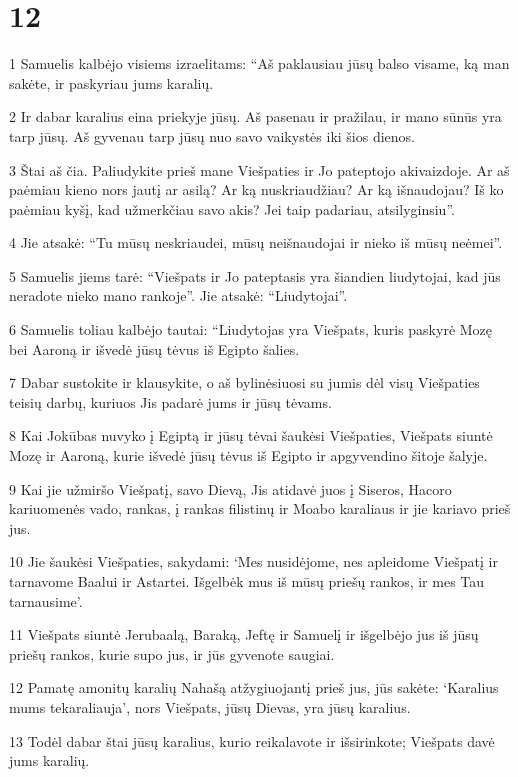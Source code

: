 \chapter{12}


\par 1 Samuelis kalbėjo visiems izraelitams: “Aš paklausiau jūsų balso visame, ką man sakėte, ir paskyriau jums karalių. 
\par 2 Ir dabar karalius eina priekyje jūsų. Aš pasenau ir pražilau, ir mano sūnūs yra tarp jūsų. Aš gyvenau tarp jūsų nuo savo vaikystės iki šios dienos. 
\par 3 Štai aš čia. Paliudykite prieš mane Viešpaties ir Jo pateptojo akivaizdoje. Ar aš paėmiau kieno nors jautį ar asilą? Ar ką nuskriaudžiau? Ar ką išnaudojau? Iš ko paėmiau kyšį, kad užmerkčiau savo akis? Jei taip padariau, atsilyginsiu”. 
\par 4 Jie atsakė: “Tu mūsų neskriaudei, mūsų neišnaudojai ir nieko iš mūsų neėmei”. 
\par 5 Samuelis jiems tarė: “Viešpats ir Jo pateptasis yra šiandien liudytojai, kad jūs neradote nieko mano rankoje”. Jie atsakė: “Liudytojai”. 
\par 6 Samuelis toliau kalbėjo tautai: “Liudytojas yra Viešpats, kuris paskyrė Mozę bei Aaroną ir išvedė jūsų tėvus iš Egipto šalies. 
\par 7 Dabar sustokite ir klausykite, o aš bylinėsiuosi su jumis dėl visų Viešpaties teisių darbų, kuriuos Jis padarė jums ir jūsų tėvams. 
\par 8 Kai Jokūbas nuvyko į Egiptą ir jūsų tėvai šaukėsi Viešpaties, Viešpats siuntė Mozę ir Aaroną, kurie išvedė jūsų tėvus iš Egipto ir apgyvendino šitoje šalyje. 
\par 9 Kai jie užmiršo Viešpatį, savo Dievą, Jis atidavė juos į Siseros, Hacoro kariuomenės vado, rankas, į rankas filistinų ir Moabo karaliaus ir jie kariavo prieš jus. 
\par 10 Jie šaukėsi Viešpaties, sakydami: ‘Mes nusidėjome, nes apleidome Viešpatį ir tarnavome Baalui ir Astartei. Išgelbėk mus iš mūsų priešų rankos, ir mes Tau tarnausime’. 
\par 11 Viešpats siuntė Jerubaalą, Baraką, Jeftę ir Samuelį ir išgelbėjo jus iš jūsų priešų rankos, kurie supo jus, ir jūs gyvenote saugiai. 
\par 12 Pamatę amonitų karalių Nahašą atžygiuojantį prieš jus, jūs sakėte: ‘Karalius mums tekaraliauja’, nors Viešpats, jūsų Dievas, yra jūsų karalius. 
\par 13 Todėl dabar štai jūsų karalius, kurio reikalavote ir išsirinkote; Viešpats davė jums karalių. 
